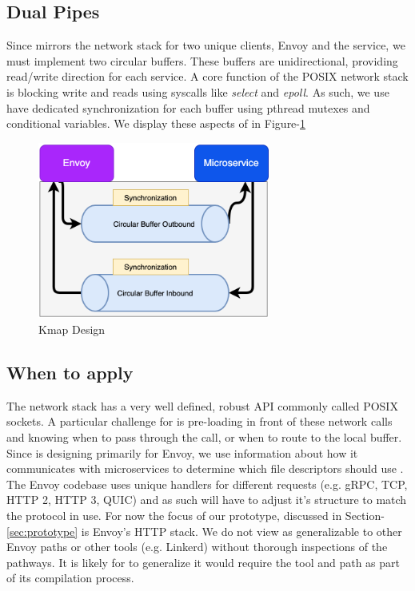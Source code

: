 \subsection{Dual Pipes}
Since \sysname mirrors the network stack for two unique clients, Envoy and the service, we must implement two circular buffers.
These buffers are unidirectional, providing read/write direction for each service.
A core function of the POSIX network stack is blocking write and reads using syscalls like \textit{select} and \textit{epoll}.
As such, we use have dedicated synchronization for each buffer using pthread mutexes and conditional variables.
We display these aspects of \sysname in Figure-\ref{fig:closeup}


\begin{figure}[!htb]
    \begin{minipage}{0.5\textwidth}
        \centering
        \includegraphics[keepaspectratio=true,width=3in]{figures/design/kmap_closeup.png}
        \caption{Kmap Design}
        \label{fig:closeup}
    \end{minipage}%
\end{figure}

\subsection{When to apply \sysname}
The network stack has a very well defined, robust API commonly called POSIX sockets.
A particular challenge for \sysname is pre-loading in front of these network calls and knowing when
to pass through the call, or when to route to the local buffer.
Since \sysname is designing primarily for Envoy, we use information about how it communicates with microservices to determine which file descriptors should use \sysname.
The Envoy codebase uses unique handlers for different requests (e.g. gRPC, TCP, HTTP 2, HTTP 3, QUIC) and as such \sysname will have to adjust it's structure to match the protocol in use.
For now the focus of our \sysname prototype, discussed in Section-\ref{sec:prototype} is Envoy's HTTP stack.
We do not view \sysname as generalizable to other Envoy paths or other tools (e.g. Linkerd) without thorough inspections of the pathways.
It is likely for \sysname to generalize it would require the tool and path as part of its compilation process.

